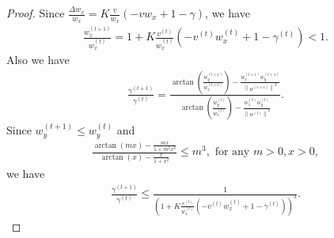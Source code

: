 \documentclass{article}
\theoremstyle{plain}
\theoremstyle{remark}
\newcommand{\norm}[1]{\left\lVert#1\right\rVert}
\def\t{^{(t)}}
\def\tt{^{(t+1)}}
\begin{document}
\begin{proof}
Since $\frac{\Delta w_x}{w_x} = K\frac{v}{w_x}(-vw_x +1-\gamma)$, we have
\begin{align}
    \frac{w_x\tt}{w_x\t}=1+K\frac{v\t}{w_x\t}(-v\t w_x\t +1-\gamma\t)<1.
\end{align}
Also we have
\begin{align}
    \frac{\gamma\tt}{\gamma\t} = \frac{\arctan(\frac{w_y\tt}{w_x\tt})-\frac{w_x\tt w_y\tt}{\norm{w\tt}^2}}{\arctan(\frac{w_y\t}{w_x\t})-\frac{w_x\t w_y\t}{\norm{w\t}^2}}.
\end{align}
Since $w_y\tt\le w_y\t$ and
\begin{align}
    \frac{\arctan(mx)-\frac{mx}{1+m^2x^2}}{\arctan(x)-\frac{x}{1+x^2}}\le m^3,\text{  for any $m>0, x>0$},
\end{align}
we have 
\begin{align}
    \frac{\gamma\tt}{\gamma\t}\le \frac{1}{\left(1+K\frac{v\t}{w_x\t}(-v\t w_x\t +1-\gamma\t)\right)^3}. \label{eq:ratiogamma}
\end{align}


\end{proof}
\end{document}

